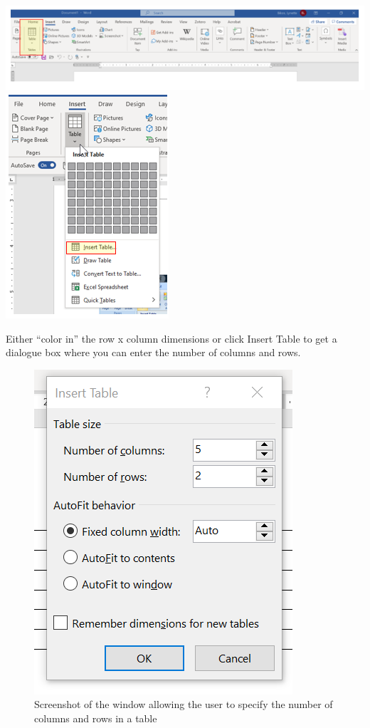 \documentclass[
  english,
]{book}
\begin{document}
\includegraphics{images/TableMagic/Insert.png}
\includegraphics{images/TableMagic/Insert1.png}

Either ``color in'' the row x column dimensions or click Insert Table to get a dialogue box where you can enter the number of columns and rows.

\begin{figure}
\centering
\includegraphics{images/TableMagic/Insert2.png}
\caption{Screenshot of the window allowing the user to specify the number of columns and rows in a table}
\end{figure}
\end{document}
